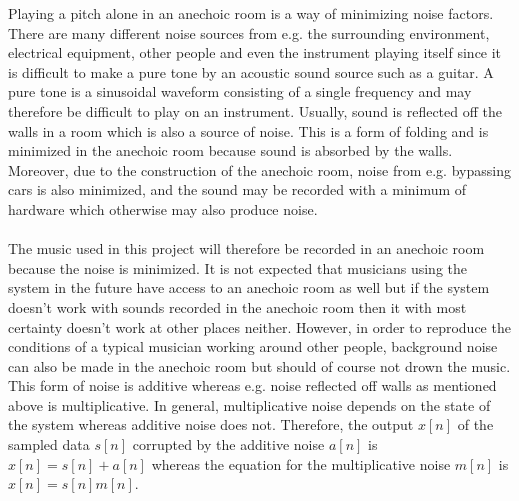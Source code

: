 Playing a pitch alone in an anechoic room is a way of minimizing noise factors. There are many different noise sources from e.g. the surrounding environment, electrical equipment, other people and even the instrument playing itself since it is difficult to make a pure tone by an acoustic sound source such as a guitar. A pure tone is a sinusoidal waveform consisting of a single frequency and may therefore be difficult to play on an instrument. \cite{AcousticNoise} Usually, sound is reflected off the walls in a room which is also a source of noise. This is a form of folding and is minimized in the anechoic room because sound is absorbed by the walls. Moreover, due to the construction of the anechoic room, noise from e.g. bypassing cars is also minimized, and the sound may be recorded with a minimum of hardware which otherwise may also produce noise.
\\ \\
The music used in this project will therefore be recorded in an anechoic room because the noise is minimized. It is not expected that musicians using the system in the future have access to an anechoic room as well but if the system doesn't work with sounds recorded in the anechoic room then it with most certainty doesn't work at other places neither. However, in order to reproduce the conditions of a typical musician working around other people, background noise can also be made in the anechoic room but should of course not drown the music. This form of noise is additive whereas e.g. noise reflected off walls as mentioned above is multiplicative. In general, multiplicative noise depends on the state of the system whereas additive noise does not. Therefore, the output $x[n]$ of the sampled data $s[n]$ corrupted by the additive noise $a[n]$ is $x[n] = s[n] + a[n]$ whereas the equation for the multiplicative noise $m[n]$ is $x[n] = s[n]m[n]$.